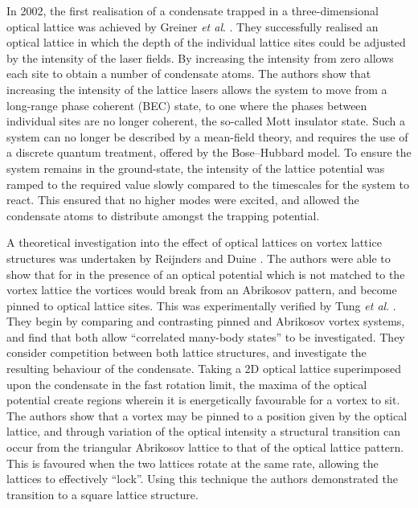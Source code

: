 In 2002, the first realisation of a condensate trapped in a three-dimensional optical lattice was achieved by Greiner \textit{et al}. \cite{OL:Greiner_nat_2002}. They successfully realised an optical lattice in which the depth of the individual lattice sites could be adjusted by the intensity of the laser fields. By increasing the intensity from zero allows each site to obtain a number of condensate atoms. The authors show that increasing the intensity of the lattice lasers allows the system to move from a long-range phase coherent (BEC) state, to one where the phases between individual sites are no longer coherent, the so-called Mott insulator state. Such a system can no longer be described by a mean-field theory, and requires the use of a discrete quantum treatment, offered by the Bose--Hubbard model. To ensure the system remains in the ground-state, the intensity of the lattice potential was ramped to the required value slowly compared to the timescales for the system to react. This ensured that no higher modes were excited, and allowed the condensate atoms to distribute amongst the trapping potential.

A theoretical investigation into the effect of optical lattices on vortex lattice structures was undertaken by Reijnders and Duine \cite{OL:Reijnders_prl_2004}. The authors were able to show that for in the presence of an optical potential which is not matched to the vortex lattice the vortices would break from an Abrikosov pattern, and become pinned to optical lattice sites. This was experimentally verified by Tung \textit{et al}. \cite{Vtx:Tung_prl_2006}. They begin by comparing and contrasting pinned and Abrikosov vortex systems, and find that both allow ``correlated many-body states'' to be investigated. They consider competition between both lattice structures, and investigate the resulting behaviour of the condensate. Taking a 2D optical lattice superimposed upon the condensate in the fast rotation limit, the maxima of the optical potential create regions wherein it is energetically favourable for a vortex to sit. The authors show that a vortex may be pinned to a position given by the optical lattice, and through variation of the optical intensity a structural transition can occur from the triangular Abrikosov lattice to that of the optical lattice pattern. This is favoured when the two lattices rotate at the same rate, allowing the lattices to effectively ``lock''. Using this technique the authors demonstrated the transition to a square lattice structure.


